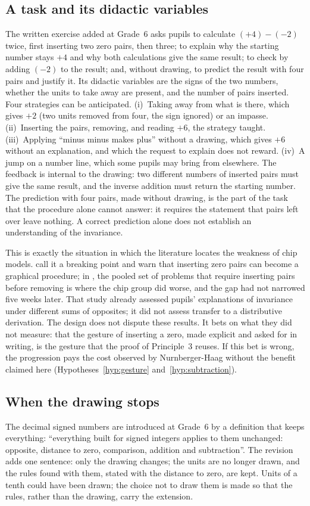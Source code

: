 \documentclass[11pt,a4paper]{article}
\theoremstyle{definition}
\begin{document}
\subsection{A task and its didactic variables}\label{sec:task}
The written exercise added at Grade~6 asks pupils to calculate $(+4)-(-2)$ twice, first inserting two zero pairs, then three; to explain why the starting number stays $+4$ and why both calculations give the same result; to check by adding $(-2)$ to the result; and, without drawing, to predict the result with four pairs and justify it. Its didactic variables are the signs of the two numbers, whether the units to take away are present, and the number of pairs inserted. Four strategies can be anticipated. (i)~Taking away from what is there, which gives $+2$ (two units removed from four, the sign ignored) or an impasse. (ii)~Inserting the pairs, removing, and reading $+6$, the strategy taught. (iii)~Applying ``minus minus makes plus'' without a drawing, which gives $+6$ without an explanation, and which the request to explain does not reward. (iv)~A jump on a number line, which some pupils may bring from elsewhere. The feedback is internal to the drawing: two different numbers of inserted pairs must give the same result, and the inverse addition must return the starting number. The prediction with four pairs, made without drawing, is the part of the task that the procedure alone cannot answer: it requires the statement that pairs left over leave nothing. A correct prediction alone does not establish an understanding of the invariance.

This is exactly the situation in which the literature locates the weakness of chip models. \citet{Vig2014} call it a breaking point and warn that inserting zero pairs can become a graphical procedure; in \citet{NurnbergerHaag2015PMENA}, the pooled set of problems that require inserting pairs before removing is where the chip group did worse, and the gap had not narrowed five weeks later. That study already assessed pupils' explanations of invariance under different sums of opposites; it did not assess transfer to a distributive derivation. The design does not dispute these results. It bets on what they did not measure: that the gesture of inserting a zero, made explicit and asked for in writing, is the gesture that the proof of Principle~3 reuses. If this bet is wrong, the progression pays the cost observed by Nurnberger-Haag without the benefit claimed here (Hypotheses~\ref{hyp:gesture} and~\ref{hyp:subtraction}).

\subsection{When the drawing stops}
The decimal signed numbers are introduced at Grade~6 by a definition that keeps everything: ``everything built for signed integers applies to them unchanged: opposite, distance to zero, comparison, addition and subtraction''. The revision adds one sentence: only the drawing changes; the units are no longer drawn, and the rules found with them, stated with the distance to zero, are kept. Units of a tenth could have been drawn; the choice not to draw them is made so that the rules, rather than the drawing, carry the extension.
\end{document}
